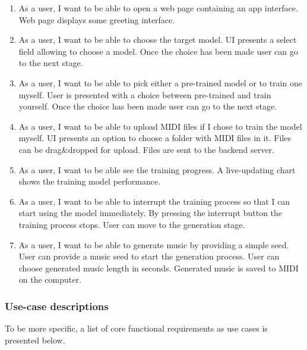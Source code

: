 \documentclass{article}
\begin{document}
\begin{enumerate}
    \item
          As a user, I want to be able to open a web page containing an app interface.
          \AC Web page displays some greeting interface.

    \item
          As a user, I want to be able to choose the target model.
          \AC UI presents a select field allowing to choose a model.
          \AC Once the choice has been made user can go to the next stage.

    \item
          As a user, I want to be able to pick either a pre-trained model or to train one myself.
          \AC User is presented with a choice between pre-trained and train yourself.
          \AC Once the choice has been made user can go to the next stage.

    \item
          As a user, I want to be able to upload MIDI files if I chose to train the model myself.
          \AC UI presents an option to choose a folder with MIDI files in it.
          \AC Files can be drag\&dropped for upload.
          \AC Files are sent to the backend server.

    \item
          As a user, I want to be able see the training progress.
          \AC A live-updating chart shows the training model performance.

    \item
          As a user, I want to be able to interrupt the training process so that I can start using the model immediately.
          \AC By pressing the interrupt button the training process stops.
          \AC User can move to the generation stage.

    \item
          As a user, I want to be able to generate music by providing a simple seed.
          \AC User can provide a music seed to start the generation process.
          \AC User can choose generated music length in seconds.
          \AC Generated music is saved to MIDI on the computer.
\end{enumerate}

\subsubsection{Use-case descriptions}

To be more specific, a list of core functional requirements as use cases is presented below.
\end{document}
